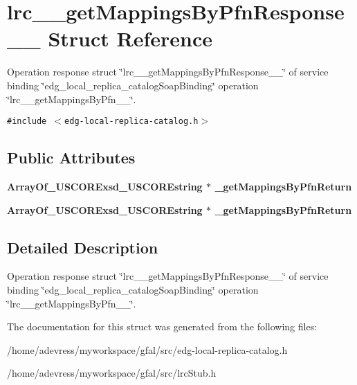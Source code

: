 \section{lrc\_\-\_\-get\-Mappings\-By\-Pfn\-Response\_\-\_\- Struct Reference}
\label{structlrc____getMappingsByPfnResponse____}
Operation response struct \char`\"{}lrc\_\-\_\-get\-Mappings\-By\-Pfn\-Response\_\-\_\-\char`\"{} of service binding \char`\"{}edg\_\-local\_\-replica\_\-catalog\-Soap\-Binding\char`\"{} operation \char`\"{}lrc\_\-\_\-get\-Mappings\-By\-Pfn\_\-\_\-\char`\"{}.  


{\tt \#include $<$edg-local-replica-catalog.h$>$}

\subsection*{Public Attributes}
\begin{CompactItemize}
\item 
\bf{Array\-Of\_\-USCORExsd\_\-USCOREstring} $\ast$ \textbf{\_\-get\-Mappings\-By\-Pfn\-Return}\label{structlrc____getMappingsByPfnResponse_____203e57d8a29975d4d6e2eaf78401c3b6}

\item 
\bf{Array\-Of\_\-USCORExsd\_\-USCOREstring} $\ast$ \textbf{\_\-get\-Mappings\-By\-Pfn\-Return}\label{structlrc____getMappingsByPfnResponse_____203e57d8a29975d4d6e2eaf78401c3b6}

\end{CompactItemize}


\subsection{Detailed Description}
Operation response struct \char`\"{}lrc\_\-\_\-get\-Mappings\-By\-Pfn\-Response\_\-\_\-\char`\"{} of service binding \char`\"{}edg\_\-local\_\-replica\_\-catalog\-Soap\-Binding\char`\"{} operation \char`\"{}lrc\_\-\_\-get\-Mappings\-By\-Pfn\_\-\_\-\char`\"{}. 



The documentation for this struct was generated from the following files:\begin{CompactItemize}
\item 
/home/adevress/myworkspace/gfal/src/edg-local-replica-catalog.h\item 
/home/adevress/myworkspace/gfal/src/lrc\-Stub.h\end{CompactItemize}

